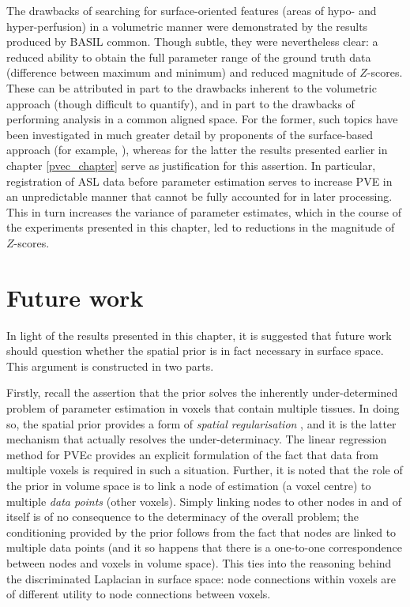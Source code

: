 \documentclass[12pt]{report}
\begin{document}
The drawbacks of searching for surface-oriented features (areas of hypo- and hyper-perfusion) in a volumetric manner were demonstrated by the results produced by BASIL common. Though subtle, they were nevertheless clear: a reduced ability to obtain the full parameter range of the ground truth data (difference between maximum and minimum) and reduced magnitude of $Z$-scores. These can be attributed in part to the drawbacks inherent to the volumetric approach (though difficult to quantify), and in part to the drawbacks of performing analysis in a common aligned space. For the former, such topics have been investigated in much greater detail by proponents of the surface-based approach (for example, \cite{Coalson2017}), whereas for the latter the results presented earlier in chapter \ref{pvec_chapter} serve as justification for this assertion. In particular, registration of ASL data before parameter estimation serves to increase PVE in an unpredictable manner that cannot be fully accounted for in later processing. This in turn increases the variance of parameter estimates, which in the course of the experiments presented in this chapter, led to reductions in the magnitude of $Z$-scores. 

\section{Future work}
\label{svb_future}

In light of the results presented in this chapter, it is suggested that future work should question whether the spatial prior is in fact necessary in surface space. This argument is constructed in two parts. 

Firstly, recall the assertion that the prior solves the inherently under-determined problem of parameter estimation in voxels that contain multiple tissues. In doing so, the spatial prior provides a form of \textit{spatial regularisation} \cite{Groves2009a}, and it is the latter mechanism that actually resolves the under-determinacy. The linear regression method for PVEc provides an explicit formulation of the fact that data from multiple voxels is required in such a situation. Further, it is noted that the role of the prior in volume space is to link a node of estimation (a voxel centre) to multiple \textit{data points} (other voxels). Simply linking nodes to other nodes in and of itself is of no consequence to the determinacy of the overall problem; the conditioning provided by the prior follows from the fact that nodes are linked to multiple data points (and it so happens that there is a one-to-one correspondence between nodes and voxels in volume space). This ties into the reasoning behind the discriminated Laplacian in surface space: node connections within voxels are of different utility to node connections between voxels. 
\end{document}
